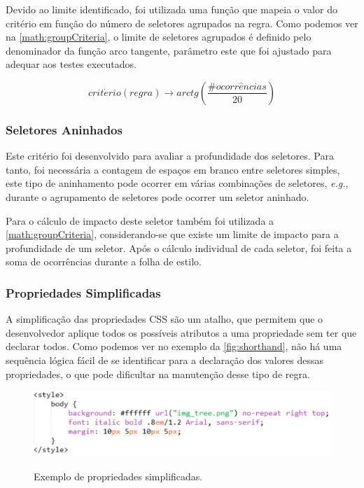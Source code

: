 Devido ao limite identificado, foi utilizada uma função que mapeia o valor do critério em função do número de seletores agrupados na regra. Como podemos ver na \autoref{math:groupCriteria}, o limite de seletores agrupados é definido pelo denominador da função arco tangente, parâmetro este que foi ajustado para adequar aos testes executados.

\begin{equation}
\label{math:groupCriteria}
	crit\acute{e}rio(regra) \rightarrow arctg\left(\frac{\#ocorr\hat{e}ncias}{20}\right)	
\end{equation}

\subsubsection{Seletores Aninhados}
Este critério foi desenvolvido para avaliar a profundidade dos seletores. Para tanto, foi necessária a contagem de espaços em branco entre seletores simples, este tipo de aninhamento pode ocorrer em várias combinações de seletores, \textit{e.g.}, durante o agrupamento de seletores pode ocorrer um seletor aninhado.

Para o cálculo de impacto deste seletor também foi utilizada a \autoref{math:groupCriteria}, considerando-se que existe um limite de impacto para a profundidade de um seletor. Após o cálculo individual de cada seletor, foi feita a soma de ocorrências durante a folha de estilo.

\subsubsection{Propriedades Simplificadas}
A simplificação das propriedades CSS são um atalho, que permitem que o desenvolvedor aplique todos os possíveis atributos a uma propriedade sem ter que declarar todos. Como podemos ver no exemplo da \autoref{fig:shorthand}, não há uma sequência lógica fácil de se identificar para a declaração dos valores dessas propriedades, o que pode dificultar na manutenção desse tipo de regra.

\begin{figure}[!htb]
	\centering
	\caption{Exemplo de propriedades simplificadas.}
	\includegraphics[width=1\textwidth]{./04-figuras/shorthand_prop}
	\label{fig:shorthand}
\end{figure}

